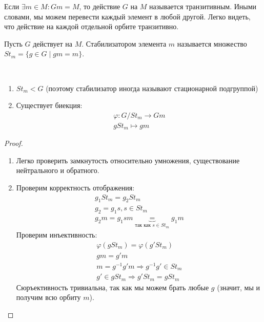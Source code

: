 Если $\exists m \in M : Gm = M$, то действие $G$ на $M$ называется транзитивным. 
Иными словами, мы можем перевести каждый элемент в любой другой. 
Легко видеть, что действие на каждой отдельной орбите транзитивно.

\begin{conj}
    Пусть $G$ действует на $M$. 
    Стабилизатором элемента $m$ называется множество $St_m = \{ g \in G \; | \; gm = m \}$.
\end{conj}

\begin{theorem-non} \quad \\
    \begin{enumerate}
        \item $St_m < G$ (поэтому стабилизатор иногда называют стационарной подгруппой) 
        \item Существует биекция: 
        \begin{gather*}
            \varphi: G / St_m \to Gm \\
            gSt_m \mapsto gm
        \end{gather*}
    \end{enumerate}
\end{theorem-non}
\begin{proof} \quad \\
    \begin{enumerate}
        \item Легко проверить замкнутость относительно умножения, существование нейтрального и обратного.
        \item Проверим корректность отображения:
        \begin{gather*}
            g_1St_m = g_2St_m \\
            g_2 = g_1s, s \in St_m \\
            g_2m = g_1sm \underbrace{=}_{\text{так как } s \in St_m} g_1m
        \end{gather*}
        Проверим инъективность:
        \begin{gather*}
            \varphi(gSt_m) = \varphi(g'St_m) \\
            gm = g'm \\
            m = g^{-1}g'm \Rightarrow g^{-1}g' \in St_m \\
            g'\in gSt_m \Rightarrow g'St_m = gSt_m
        \end{gather*}
        Сюръективность тривиальна, так как мы можем брать любые $g$ (значит, мы и получим всю орбиту $m$).
    \end{enumerate}
\end{proof}

